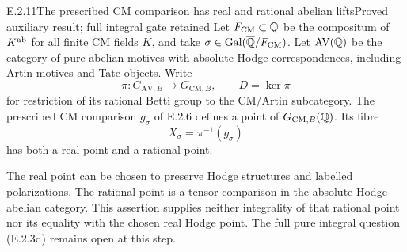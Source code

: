 \begin{result}{E.2.11}{The prescribed CM comparison has real and rational abelian lifts}{Proved auxiliary result; full integral gate retained}
Let $F_{\rm CM}\subset\overline{\mathbb Q}$ be the compositum of $K^{\rm ab}$ for all
finite CM fields $K$, and take $\sigma\in\operatorname{Gal}(\overline{\mathbb Q}/F_{\rm CM})$.
Let $\mathrm{AV}(\mathbb Q)$ be the category of pure abelian motives with
absolute Hodge correspondences, including Artin motives and Tate
objects. Write
\[
 \pi:G_{\mathrm{AV},B}\longrightarrow G_{\mathrm{CM},B},
 \qquad D=\ker\pi
\]
for restriction of its rational Betti group to the CM/Artin subcategory.
The prescribed CM comparison $g_\sigma$ of E.2.6 defines a point of
$G_{\mathrm{CM},B}(\mathbb Q)$. Its fibre
\[
 X_\sigma=\pi^{-1}(g_\sigma)
 \tag{E.2.11a}
\]
has both a real point and a rational point.

The real point can be chosen to preserve Hodge structures and labelled
polarizations. The rational point is a tensor comparison in the
absolute-Hodge abelian category. This assertion supplies neither
integrality of that rational point nor its equality with the chosen
real Hodge point. The full pure integral question (E.2.3d) remains open
at this step.
\end{result}
